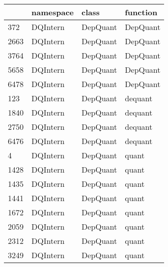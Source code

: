 \begin{tabular}{llll}
\toprule
{} &             namespace &                      class &                                  function \\
\midrule
372  &              DQIntern &                   DepQuant &                                  DepQuant \\
2663 &              DQIntern &                   DepQuant &                                  DepQuant \\
3764 &              DQIntern &                   DepQuant &                                  DepQuant \\
5658 &              DQIntern &                   DepQuant &                                  DepQuant \\
6478 &              DQIntern &                   DepQuant &                                  DepQuant \\
123  &              DQIntern &                   DepQuant &                                   dequant \\
1840 &              DQIntern &                   DepQuant &                                   dequant \\
2750 &              DQIntern &                   DepQuant &                                   dequant \\
6476 &              DQIntern &                   DepQuant &                                   dequant \\
4    &              DQIntern &                   DepQuant &                                     quant \\
1428 &              DQIntern &                   DepQuant &                                     quant \\
1435 &              DQIntern &                   DepQuant &                                     quant \\
1441 &              DQIntern &                   DepQuant &                                     quant \\
1672 &              DQIntern &                   DepQuant &                                     quant \\
2059 &              DQIntern &                   DepQuant &                                     quant \\
2312 &              DQIntern &                   DepQuant &                                     quant \\
3249 &              DQIntern &                   DepQuant &                                     quant \\

\end{tabular}
